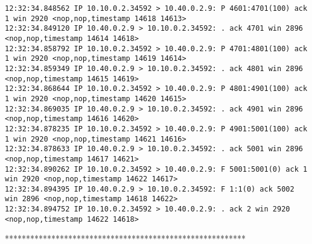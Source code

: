 \documentclass[a4paper,12pt]{article}
\begin{document}
\begin{lstlisting}
12:32:34.848562 IP 10.10.0.2.34592 > 10.40.0.2.9: P 4601:4701(100) ack 1 win 2920 <nop,nop,timestamp 14618 14613>
12:32:34.849120 IP 10.40.0.2.9 > 10.10.0.2.34592: . ack 4701 win 2896 <nop,nop,timestamp 14614 14618>
12:32:34.858792 IP 10.10.0.2.34592 > 10.40.0.2.9: P 4701:4801(100) ack 1 win 2920 <nop,nop,timestamp 14619 14614>
12:32:34.859349 IP 10.40.0.2.9 > 10.10.0.2.34592: . ack 4801 win 2896 <nop,nop,timestamp 14615 14619>
12:32:34.868644 IP 10.10.0.2.34592 > 10.40.0.2.9: P 4801:4901(100) ack 1 win 2920 <nop,nop,timestamp 14620 14615>
12:32:34.869035 IP 10.40.0.2.9 > 10.10.0.2.34592: . ack 4901 win 2896 <nop,nop,timestamp 14616 14620>
12:32:34.878235 IP 10.10.0.2.34592 > 10.40.0.2.9: P 4901:5001(100) ack 1 win 2920 <nop,nop,timestamp 14621 14616>
12:32:34.878633 IP 10.40.0.2.9 > 10.10.0.2.34592: . ack 5001 win 2896 <nop,nop,timestamp 14617 14621>
12:32:34.890262 IP 10.10.0.2.34592 > 10.40.0.2.9: F 5001:5001(0) ack 1 win 2920 <nop,nop,timestamp 14622 14617>
12:32:34.894395 IP 10.40.0.2.9 > 10.10.0.2.34592: F 1:1(0) ack 5002 win 2896 <nop,nop,timestamp 14618 14622>
12:32:34.894752 IP 10.10.0.2.34592 > 10.40.0.2.9: . ack 2 win 2920 <nop,nop,timestamp 14622 14618>
\end{lstlisting}

*********************************************************
\end{document}
